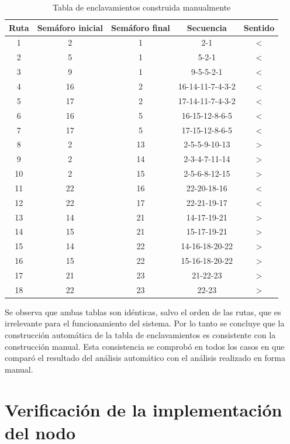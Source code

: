 	 \begin{table}[!hbt]
	\caption{Tabla de enclavamientos construida manualmente}
	\label{tabla_manual}
	\centering
	\begin{tabular}{ c  c  c  c  c }
	\hline
	Ruta & Semáforo inicial & Semáforo final & Secuencia & Sentido \\	
	\hline
		1 & 2 & 1 & 2-1 & < \\
		2 & 5 & 1 & 5-2-1 & < \\
		3 & 9 & 1 & 9-5-5-2-1 & < \\
		4 & 16 & 2 & 16-14-11-7-4-3-2 & < \\
		5 & 17 & 2 & 17-14-11-7-4-3-2 & < \\
		6 & 16 & 5 & 16-15-12-8-6-5 & < \\
		7 & 17 & 5 & 17-15-12-8-6-5 & < \\
		8 & 2 & 13 & 2-5-5-9-10-13 & > \\
		9 & 2 & 14 & 2-3-4-7-11-14 & > \\
		10 & 2 & 15 & 2-5-6-8-12-15 & > \\
		11 & 22 & 16 & 22-20-18-16 & < \\
		12 & 22 & 17 & 22-21-19-17 & < \\
		13 & 14 & 21 & 14-17-19-21 & > \\
		14 & 15 & 21 & 15-17-19-21 & > \\	
		15 & 14 & 22 & 14-16-18-20-22 & > \\	
		16 & 15 & 22 & 15-16-18-20-22 & > \\		
		17 & 21 & 23 & 21-22-23 & > \\	
		18 & 22 & 23 & 22-23 & > \\
	\end{tabular}
	\end{table}
	
	 
	 
	 Se observa que ambas tablas son idénticas, salvo el orden de las rutas, que es irrelevante para el funcionamiento del sistema. Por lo tanto se concluye que la construcción automática de la tabla de enclavamientos es consistente con la construcción manual. Esta consistencia se comprobó en todos los casos en que comparó el resultado del análisis automático con el análisis realizado en forma manual.			
			
\section{Verificación de la implementación del nodo}

